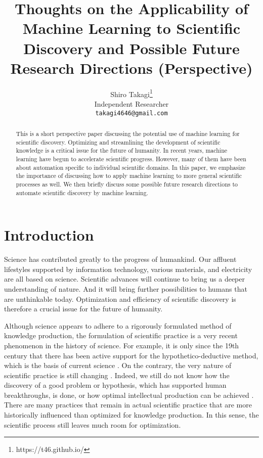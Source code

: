 \documentclass{article}
\title{Thoughts on the Applicability of Machine Learning to Scientific Discovery and Possible Future Research Directions (Perspective)}
\author{%
  Shiro Takagi\thanks{https://t46.github.io/} \\
  Independent Researcher\\
  \texttt{takagi4646@gmail.com} \\
}
\begin{document}
\maketitle

\begin{abstract}
 This is a short perspective paper discussing the potential use of machine learning for scientific discovery. Optimizing and streamlining the development of scientific knowledge is a critical issue for the future of humanity. In recent years, machine learning have begun to accelerate scientific progress. However, many of them have been about automation specific to individual scientific domains. In this paper, we emphasize the importance of discussing how to apply machine learning to more general scientific processes as well. We then briefly discuss some possible future research directions to automate scientific discovery by machine learning.
\end{abstract}

\section{Introduction}
Science has contributed greatly to the progress of humankind. Our affluent lifestyles supported by information technology, various materials, and electricity are all based on science. Scientific advances will continue to bring us a deeper understanding of nature. And it will bring further possibilities to humans that are unthinkable today. Optimization and efficiency of scientific discovery is therefore a crucial issue for the future of humanity.

Although science appears to adhere to a rigorously formulated method of knowledge production, the formulation of scientific practice is a very recent phenomenon in the history of science. For example, it is only since the 19th century that there has been active support for the hypothetico-deductive method, which is the basis of current science \cite{sankey2014}. On the contrary, the very nature of scientific practice is still changing \cite{hey2009fourth}. Indeed, we still do not know how the discovery of a good problem or hypothesis, which has supported human breakthroughs, is done, or how optimal intellectual production can be achieved \cite{scientificdiscovery}. There are many practices that remain in actual scientific practice that are more historically influenced than optimized for knowledge production. In this sense, the scientific process still leaves much room for optimization.
\end{document}
